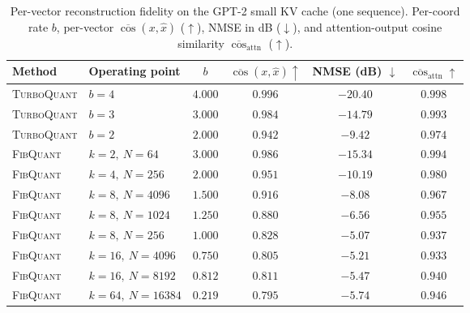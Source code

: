 \documentclass{article}
\theoremstyle{definition}
\theoremstyle{remark}
\begin{document}
\begin{table}[h]
\caption{Per-vector reconstruction fidelity on the GPT-2 small KV
cache (one sequence).  Per-coord rate $b$, per-vector
$\overline{\cos}(x, \hat x)$ ($\uparrow$), NMSE in dB
($\downarrow$), and attention-output cosine similarity
$\overline{\cos}_{\mathrm{attn}}$ ($\uparrow$).}
\label{tab:recon}
\begin{center}\small
\begin{tabular}{l l c c c c}
\toprule
Method & Operating point & $b$ & $\overline{\cos}(x, \hat x) \uparrow$
& NMSE (dB) $\downarrow$ & $\overline{\cos}_{\mathrm{attn}} \uparrow$ \\
\midrule
\textsc{TurboQuant} & $b = 4$         & $4.000$ & $0.996$ & $-20.40$ & $0.998$ \\
\textsc{TurboQuant} & $b = 3$         & $3.000$ & $0.984$ & $-14.79$ & $0.993$ \\
\textsc{TurboQuant} & $b = 2$         & $2.000$ & $0.942$ & $-9.42$  & $0.974$ \\
\midrule
\textsc{FibQuant} & $k = 2,\ N = 64$    & $3.000$ & $0.986$ & $-15.34$ & $0.994$ \\
\textsc{FibQuant} & $k = 4,\ N = 256$   & $2.000$ & $0.951$ & $-10.19$ & $0.980$ \\
\textsc{FibQuant} & $k = 8,\ N = 4096$  & $1.500$ & $0.916$ & $-8.08$  & $0.967$ \\
\textsc{FibQuant} & $k = 8,\ N = 1024$  & $1.250$ & $0.880$ & $-6.56$  & $0.955$ \\
\textsc{FibQuant} & $k = 8,\ N = 256$   & $1.000$ & $0.828$ & $-5.07$  & $0.937$ \\
\textsc{FibQuant} & $k = 16,\ N = 4096$ & $0.750$ & $0.805$ & $-5.21$  & $0.933$ \\
\textsc{FibQuant} & $k = 16,\ N = 8192$ & $0.812$ & $0.811$ & $-5.47$  & $0.940$ \\
\textsc{FibQuant} & $k = 64,\ N = 16384$& $0.219$ & $0.795$ & $-5.74$  & $0.946$ \\
\bottomrule
\end{tabular}
\end{center}
\end{table}
 
\end{document}
